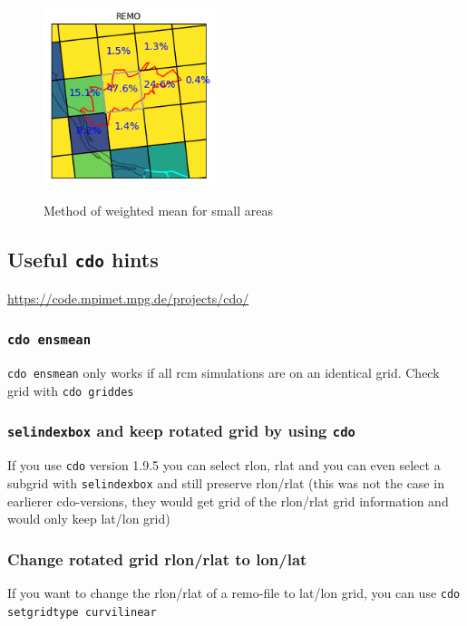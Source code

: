 \begin{figure} [h!tb]
\begin{center}
\includegraphics[width=5cm, natwidth=200, natheight=195]{./fig/krueckau_weights_REMOdetailliert.png} \\
\caption{Method of weighted mean for small areas}
\end{center}
\end{figure}
\figure

%

\subsection{Useful \texttt{cdo} hints}
\url{https://code.mpimet.mpg.de/projects/cdo/}

\subsubsection{\texttt{cdo ensmean}}
\texttt{cdo ensmean} only works if all rcm simulations are on an identical grid.
Check grid with \texttt{cdo griddes}

\subsubsection{\texttt{selindexbox} and keep rotated grid by using \texttt{cdo}}
If you use \texttt{cdo} version 1.9.5 you can select rlon, rlat and you can even select a subgrid with \texttt{selindexbox} and still preserve rlon/rlat
(this was not the case in earlierer cdo-versions, they would get grid of the rlon/rlat grid information and would only keep lat/lon grid)

\subsubsection{Change rotated grid rlon/rlat to lon/lat}
If you want to change the rlon/rlat of a remo-file to lat/lon grid, you can use \texttt{cdo setgridtype curvilinear}

